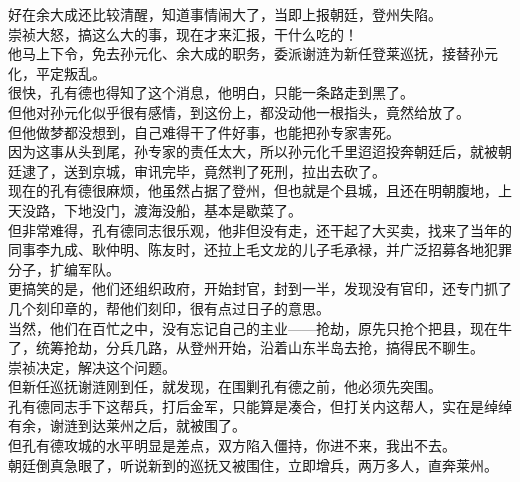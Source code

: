 \begin{multicols}{\theparacolNo}
好在余大成还比较清醒，知道事情闹大了，当即上报朝廷，登州失陷。\\

崇祯大怒，搞这么大的事，现在才来汇报，干什么吃的！\\

他马上下令，免去孙元化、余大成的职务，委派谢涟为新任登莱巡抚，接替孙元化，平定叛乱。\\

很快，孔有德也得知了这个消息，他明白，只能一条路走到黑了。\\

但他对孙元化似乎很有感情，到这份上，都没动他一根指头，竟然给放了。\\

但他做梦都没想到，自己难得干了件好事，也能把孙专家害死。\\

因为这事从头到尾，孙专家的责任太大，所以孙元化千里迢迢投奔朝廷后，就被朝廷逮了，送到京城，审讯完毕，竟然判了死刑，拉出去砍了。\\

现在的孔有德很麻烦，他虽然占据了登州，但也就是个县城，且还在明朝腹地，上天没路，下地没门，渡海没船，基本是歇菜了。\\

但非常难得，孔有德同志很乐观，他非但没有走，还干起了大买卖，找来了当年的同事李九成、耿仲明、陈友时，还拉上毛文龙的儿子毛承禄，并广泛招募各地犯罪分子，扩编军队。\\

更搞笑的是，他们还组织政府，开始封官，封到一半，发现没有官印，还专门抓了几个刻印章的，帮他们刻印，很有点过日子的意思。\\

当然，他们在百忙之中，没有忘记自己的主业——抢劫，原先只抢个把县，现在牛了，统筹抢劫，分兵几路，从登州开始，沿着山东半岛去抢，搞得民不聊生。\\

崇祯决定，解决这个问题。\\

但新任巡抚谢涟刚到任，就发现，在围剿孔有德之前，他必须先突围。\\

孔有德同志手下这帮兵，打后金军，只能算是凑合，但打关内这帮人，实在是绰绰有余，谢涟到达莱州之后，就被围了。\\

但孔有德攻城的水平明显是差点，双方陷入僵持，你进不来，我出不去。\\

朝廷倒真急眼了，听说新到的巡抚又被围住，立即增兵，两万多人，直奔莱州。\\


\end{multicols}
